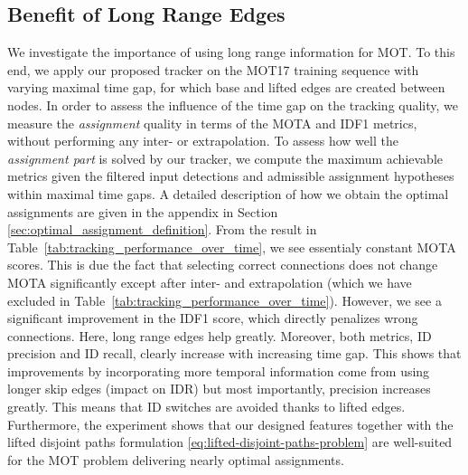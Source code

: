 \documentclass{article}
\begin{document}
\subsection{Benefit of Long Range Edges}
\label{sec:exp_long_range_edges}
We investigate the importance of using long range information for MOT. To this end, we apply our proposed tracker on the MOT17 training sequence with varying maximal time gap, for which base and lifted edges are created between nodes. In order to assess the influence of the time gap on the tracking quality, we measure the \textit{assignment} quality in terms of the MOTA and IDF1 metrics, without performing any inter- or extrapolation.
To assess how well the \textit{assignment part} is solved by our tracker, we compute the maximum achievable metrics given the filtered input detections and admissible assignment hypotheses within maximal time gaps. A detailed description of how we obtain the optimal assignments are given in the appendix in Section \ref{sec:optimal_assignment_definition}.
From the result in Table~\ref{tab:tracking_performance_over_time}, we see essentialy constant MOTA scores. 
This is due the fact that selecting correct connections does not change MOTA significantly except after inter- and extrapolation (which we have excluded in Table~\ref{tab:tracking_performance_over_time}). 
However, we see a significant improvement in the IDF1 score, which directly penalizes wrong connections. Here, long range edges help greatly.
Moreover, both metrics, ID precision and ID recall, clearly increase with increasing time gap. This shows that improvements by incorporating more temporal information come from using longer skip edges (impact on IDR) but most importantly, precision increases greatly. This means that ID switches are avoided thanks to lifted edges.
Furthermore, the experiment shows that our designed features together with the lifted disjoint paths formulation \eqref{eq:lifted-disjoint-paths-problem} are well-suited for the MOT problem delivering nearly optimal assignments. 
\end{document}
